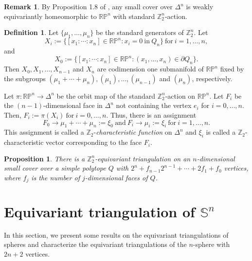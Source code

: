 \documentclass[11pt]{amsart}
\numberwithin{equation}{section}
\newtheorem{prop}[theorem]{Proposition}
\theoremstyle{definition}
\newtheorem{defn}[theorem]{Definition}
\newtheorem{remark}[theorem]{Remark}
\newcommand{\Sp}{\mathbb{S}}
\def \bb{\mathbb}
\def \ZZ{{\bb{Z}}}
\begin{document}
\begin{remark}
{\rm By Proposition 1.8 of \cite{DJ}, any small cover over $\Delta^n$ is weakly equivariantly homeomorphic to $\mathbb{RP}^n$  with standard $\mathbb{Z}_2^n$-action.} 
\end{remark}



\begin{defn}\label{Charecteristic}
Let $\{\mu_1, \ldots, \mu_n\}$ be the standard generators of $\ZZ_2^n$.
Let $$X_i := \{[x_1: \cdots : x_n] \in \mathbb{RP}^n : x_i=0 ~\mbox{in}~ Q_n\}~ \mbox{for}~ i= 1, \ldots, n,$$
and $$X_0 := \{[x_1 : \cdots : x_n] \in \mathbb{RP}^n : (x_1, \ldots, x_n) \in \partial Q_n\}.$$ 
Then $X_0, X_1, \ldots, X_{n-1}$ and $ X_n$ are codimension one submanifold of $\mathbb{RP}^n$ fixed by the subgroups
$(\mu_1+ \cdots + \mu_n), (\mu_1), \ldots, (\mu_{n-1})$ and $(\mu_n)$, respectively. 

Let $\pi \colon \mathbb{RP}^n \to \Delta^n$ be the orbit map of the standard $\ZZ_2^n$-action on $\mathbb{RP}^n$. 
Let $F_i$ be the $(n-1)$-dimensional face in $\Delta^n$ not containing the vertex $e_i$ for $i=0, \ldots, n$. Then, $F_i := \pi(X_i)~\mbox{for}~ i= 0, \ldots, n$.
Thus, there is an assignment 
$$F_0 \to \mu_1+ \cdots + \mu_n:=\xi_0 ~\mbox{and} ~ F_i \to \mu_i :=\xi_i ~ \mbox{for}~ i =1, \ldots, n.$$
This assignment is called a $\ZZ_2$-{\em characteristic function} on $\Delta^n$ and $\xi_i$
is called a $\ZZ_2$-characteristic vector corresponding to the face $F_i$. 

\end{defn}



\begin{prop}\cite[Lemma 3.6]{BS}\label{equivariant}
There is a $\mathbb{Z}_2^n$-equivariant triangulation on an $n$-dimensional small cover over a simple polytope $Q$ with $2^n + f_{n-1} 2^{n-1} + \cdots + 2f_1+ f_0$ vertices, where $f_j$ is the number of $j$-dimensional faces of $Q$. 
\end{prop}


\section{Equivariant triangulation of $\Sp^n$}\label{sphere}
In this section, we present some results on the equivariant triangulations of spheres and characterize the equivariant triangulations of the $n$-sphere with $2n+2$ vertices.
\end{document}
